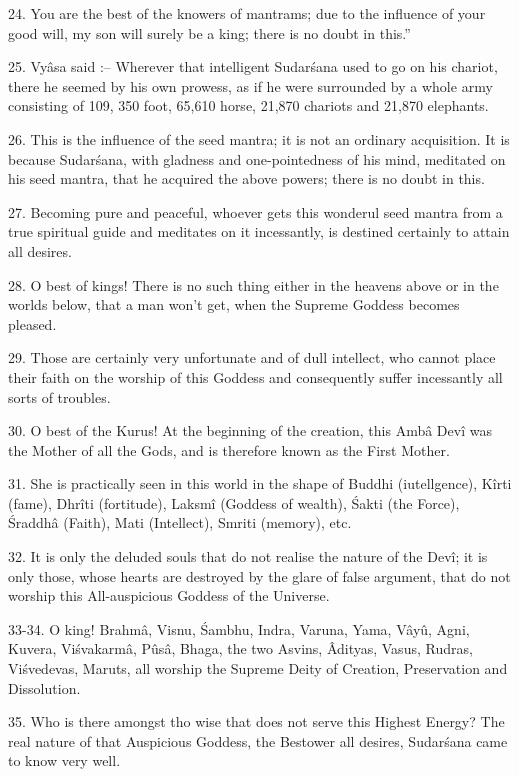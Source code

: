 24. You are the best of the knowers of mantrams; due to the influence of your good will, my son will surely be a king; there is no doubt in this.''

25. Vy\^asa said :-- Wherever that intelligent Sudar\'sana used to go on his chariot, there he seemed by his own prowess, as if he were surrounded by a whole army consisting of 109, 350 foot, 65,610 horse, 21,870 chariots and 21,870 elephants.

26. This is the influence of the seed mantra; it is not an ordinary acquisition. It is because Sudar\'sana, with gladness and one-pointedness of his mind, meditated on his seed mantra, that he acquired the above powers; there is no doubt in this.

27. Becoming pure and peaceful, whoever gets this wonderul seed mantra from a true spiritual guide and meditates on it incessantly, is destined certainly to attain all desires.

28. O best of kings! There is no such thing either in the heavens above or in the worlds below, that a man won't get, when the Supreme Goddess becomes pleased.

29. Those are certainly very unfortunate and of dull intellect, who cannot place their faith on the worship of this Goddess and consequently suffer incessantly all sorts of troubles.

30. O best of the Kurus! At the beginning of the creation, this Amb\^a Dev\^i was the Mother of all the Gods, and is therefore known as the First Mother.

31. She is practically seen in this world in the shape of Buddhi (iutellgence), K\^irti (fame), Dhr\^iti (fortitude), Laksm\^i (Goddess of wealth), \'Sakti (the Force), \'Sraddh\^a (Faith), Mati (Intellect), Smriti (memory), etc.

32. It is only the deluded souls that do not realise the nature of the Dev\^i; it is only those, whose hearts are destroyed by the glare of false argument, that do not worship this All-auspicious Goddess of the Universe.

33-34. O king! Brahm\^a, Visnu, \'Sambhu, Indra, Varuna, Yama, V\^ayû, Agni, Kuvera, Vi\'svakarm\^a, Pûs\^a, Bhaga, the two Asvins, Âdityas, Vasus, Rudras, Vi\'svedevas, Maruts, all worship the Supreme Deity of Creation, Preservation and Dissolution.

35. Who is there amongst tho wise that does not serve this Highest Energy? The real nature of that Auspicious Goddess, the Bestower all desires, Sudar\'sana came to know very well.

